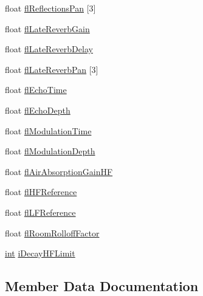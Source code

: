 \begin{DoxyCompactItemize}
float \hyperlink{struct_e_f_x_e_a_x_r_e_v_e_r_b_p_r_o_p_e_r_t_i_e_s_a1e98ae2dcbd5cb25c6784b5f1181dbb1}{fl\+Reflections\+Pan} \mbox{[}3\mbox{]}
\item 
float \hyperlink{struct_e_f_x_e_a_x_r_e_v_e_r_b_p_r_o_p_e_r_t_i_e_s_ac32101bd6ea23d41a39100d1036a4acf}{fl\+Late\+Reverb\+Gain}
\item 
float \hyperlink{struct_e_f_x_e_a_x_r_e_v_e_r_b_p_r_o_p_e_r_t_i_e_s_a45c5f6a516e4ffd08ccd6bd35a15b3c2}{fl\+Late\+Reverb\+Delay}
\item 
float \hyperlink{struct_e_f_x_e_a_x_r_e_v_e_r_b_p_r_o_p_e_r_t_i_e_s_ae8a3cba02be4a6e4af41c551b1856c84}{fl\+Late\+Reverb\+Pan} \mbox{[}3\mbox{]}
\item 
float \hyperlink{struct_e_f_x_e_a_x_r_e_v_e_r_b_p_r_o_p_e_r_t_i_e_s_aa1ad488819884fe0ca9a6ac3cb4ab581}{fl\+Echo\+Time}
\item 
float \hyperlink{struct_e_f_x_e_a_x_r_e_v_e_r_b_p_r_o_p_e_r_t_i_e_s_ae1b2a5691ad36203427b70856158f50f}{fl\+Echo\+Depth}
\item 
float \hyperlink{struct_e_f_x_e_a_x_r_e_v_e_r_b_p_r_o_p_e_r_t_i_e_s_a607ea8692513389b603e9851fb9f14dc}{fl\+Modulation\+Time}
\item 
float \hyperlink{struct_e_f_x_e_a_x_r_e_v_e_r_b_p_r_o_p_e_r_t_i_e_s_ab3d44b53ddcc1e6d295b89e8fa28a8af}{fl\+Modulation\+Depth}
\item 
float \hyperlink{struct_e_f_x_e_a_x_r_e_v_e_r_b_p_r_o_p_e_r_t_i_e_s_a80c8ad56521d0918975aaba19edcd1be}{fl\+Air\+Absorption\+Gain\+HF}
\item 
float \hyperlink{struct_e_f_x_e_a_x_r_e_v_e_r_b_p_r_o_p_e_r_t_i_e_s_af42ea95461db17e0b73b0a4decf720c3}{fl\+H\+F\+Reference}
\item 
float \hyperlink{struct_e_f_x_e_a_x_r_e_v_e_r_b_p_r_o_p_e_r_t_i_e_s_a9d7409aeb14b972f77fd83643d7ecfaa}{fl\+L\+F\+Reference}
\item 
float \hyperlink{struct_e_f_x_e_a_x_r_e_v_e_r_b_p_r_o_p_e_r_t_i_e_s_addd42aea886c8930594cf15f91fb8bec}{fl\+Room\+Rolloff\+Factor}
\item 
\hyperlink{_s_d_l__thread_8h_a6a64f9be4433e4de6e2f2f548cf3c08e}{int} \hyperlink{struct_e_f_x_e_a_x_r_e_v_e_r_b_p_r_o_p_e_r_t_i_e_s_a454d6bbeaeaf108414712439d36679ff}{i\+Decay\+H\+F\+Limit}
\end{DoxyCompactItemize}


\subsection{Member Data Documentation}
